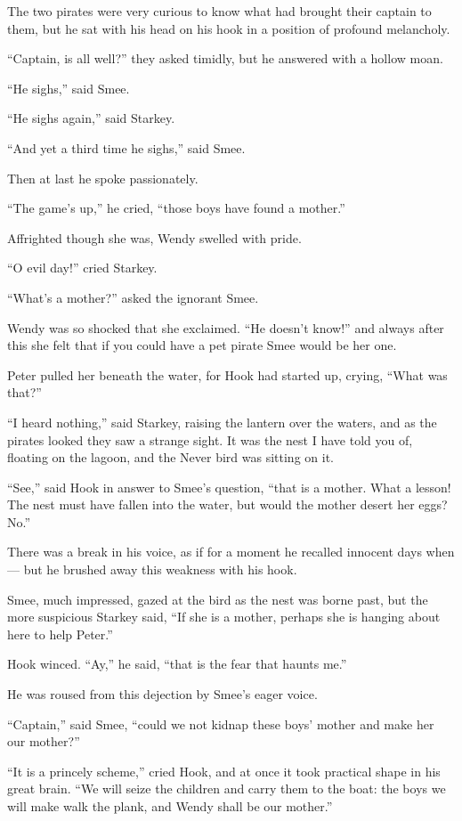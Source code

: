 The two pirates were very curious to know what had brought their captain to them,
but he sat with his head on his hook in a position of profound melancholy.

“Captain, is all well?\@” they asked timidly, but he answered with a hollow moan.

“He sighs,” said Smee.

“He sighs again,” said Starkey.

“And yet a third time he sighs,” said Smee.

Then at last he spoke passionately.

“The game’s up,” he cried, “those boys have found a mother.”

Affrighted though she was, Wendy swelled with pride.

“O evil day!\@” cried Starkey.

“What’s a mother?\@” asked the ignorant Smee.

Wendy was so shocked that she exclaimed.
“He doesn’t know!\@” and always after this she felt that if you could have a pet pirate Smee would be her one.

Peter pulled her beneath the water, for Hook had started up, crying, “What was that?”

“I heard nothing,” said Starkey, raising the lantern over the waters,
and as the pirates looked they saw a strange sight.
It was the nest I have told you of, floating on the lagoon, and the Never bird was sitting on it.

“See,” said Hook in answer to Smee’s question, “that is a mother.
What a lesson!
The nest must have fallen into the water, but would the mother desert her eggs?
No.”

There was a break in his voice, as if for a moment he recalled innocent days when—%
but he brushed away this weakness with his hook.

Smee, much impressed, gazed at the bird as the nest was borne past,
but the more suspicious Starkey said, “If she is a mother, perhaps she is hanging about here to help Peter.”

Hook winced.
“Ay,” he said, “that is the fear that haunts me.”

He was roused from this dejection by Smee’s eager voice.

“Captain,” said Smee, “could we not kidnap these boys’ mother and make her our mother?”

“It is a princely scheme,” cried Hook, and at once it took practical shape in his great brain.
“We will seize the children and carry them to the boat:
the boys we will make walk the plank, and Wendy shall be our mother.”

